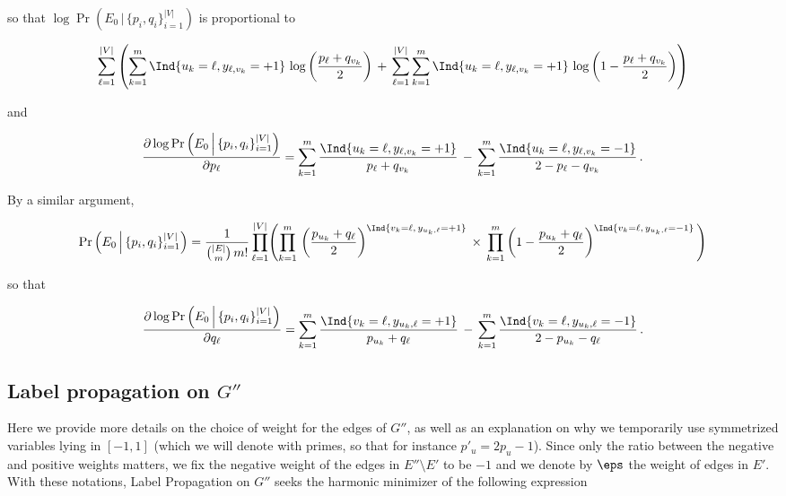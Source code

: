 so that $\log \Pr\left(E_0\,\Big|\, \{p_i, q_i\}_{i=1}^{|V|}\right)$ is proportional to

\begin{equation*}
  \sum_{\ell=1}^{|V|}\left(\sum_{k=1}^m \Ind{u_k = \ell,y_{\ell,v_k}=+1}\,
  \log\left(\frac{p_{\ell}+q_{v_k}}{2} \right)\, +\,
  \sum_{\ell=1}^{|V|}\sum_{k=1}^m \Ind{u_k = \ell,y_{\ell,v_k}=+1}\, 
\log\left(1-\frac{p_{\ell}+q_{v_k}}{2} \right)\right)
\end{equation*}

and

\begin{equation*}
  \frac{\partial \log \Pr\left(E_0\,\Big|\, \{p_i, q_i\}_{i=1}^{|V|}\right)}{\partial p_{\ell}}
  = \sum_{k=1}^m 
  \frac{\Ind{u_k = \ell,y_{\ell,v_k}=+1}}{p_{\ell}+q_{v_k}}\,
   - \,
  \sum_{k=1}^m \frac{\Ind{u_k = \ell,y_{\ell,v_k}=-1}}{2-p_{\ell}-q_{v_k}}\,.
\end{equation*}

By a similar argument,

\begin{align*}
  \Pr\left(E_0\,\Big|\, \{p_i, q_i\}_{i=1}^{|V|}\right) 
=
  \frac{1}{\binom{|E|}{m}\,m!}
  \prod_{\ell=1}^{|V|}\Biggl(\prod_{k=1}^m\,
    \left(\frac{p_{u_k}+q_{\ell}}{2} \right)^{\Ind{v_k = \ell,\,y_{u_k,\ell}=+1}}\,
\times\,
    \prod_{k=1}^m\left(1-\frac{p_{u_k}+q_{\ell}}{2} \right)^{\Ind{v_k = \ell,\,y_{u_k,\ell}=-1}}\Biggl)
\end{align*}

so that

\begin{align*}
\frac{\partial \log \Pr\left(E_0\,\Big|\, \{p_i, q_i\}_{i=1}^{|V|}\right)}{\partial q_{\ell}}
= \sum_{k=1}^m \frac{\Ind{v_k = \ell,y_{u_k,\ell}=+1}}{p_{u_k}+q_{\ell}}\,
- \, \sum_{k=1}^m \frac{\Ind{v_k = \ell,y_{u_k,\ell}=-1}}{2-p_{u_k}-q_{\ell}}\,.
\end{align*}

\subsection{Label propagation on $G''$}
\label{ssec:troll_lprop_weights}

Here we provide more details on the choice of weight for the edges of $G''$, as well as an
explanation on why we temporarily use symmetrized variables lying in $[-1, 1]$ (which we will denote
with primes, so that for instance $p'_u = 2p_u-1$). Since only the ratio between the negative and
positive weights matters, we fix the negative weight of the edges in $E''\setminus E'$ to be $-1$
and we denote by $\eps$ the weight of edges in $E'$.  With these notations, Label Propagation on
$G''$ seeks the harmonic minimizer of the following expression 

